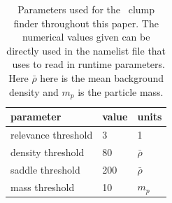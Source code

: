 \begin{table}
\centering
\caption{Parameters used for the \phew\ clump finder throughout this
  paper.  The numerical values given can be directly used in the
  namelist file that \ramses\ uses to read in runtime parameters.
  Here $\bar \rho$ here is the mean background density and $m_p$ is
  the particle mass.}
\label{tab:phew-parameters}
\begin{tabular}[c]{l l l}
  parameter				&	value		& units \\
  \hline
  relevance threshold			&	3		& 1		\\
  density threshold			& 80			& $\bar \rho$ 	\\
  saddle threshold			& 200			& $\bar \rho$	\\
  mass threshold			& 10			& $m_p$		\\
  \hline
\end{tabular}
\end{table}



